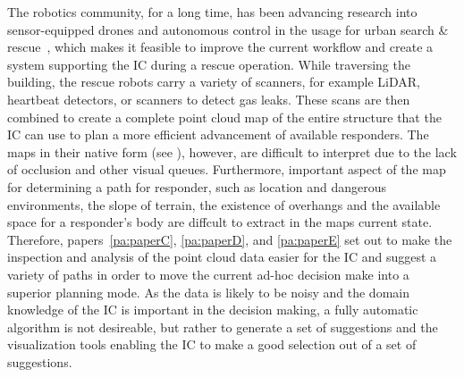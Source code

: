 The robotics community, for a long time, has been advancing research into sensor-equipped drones and autonomous control in the usage for urban search \& rescue~\cite{liu2013robotic}, which makes it feasible to improve the current workflow and create a system supporting the IC during a rescue operation.  While traversing the building, the rescue robots carry a variety of scanners, for example LiDAR, heartbeat detectors, or scanners to detect gas leaks.  These scans are then combined to create a complete  point cloud map of the entire structure that the IC can use to plan a more efficient  advancement of available responders.  The maps in their native form (see ), however, are difficult to interpret due to the lack of occlusion and other visual queues.  Furthermore, important aspect of the map for determining a path for responder, such as location and dangerous environments, the slope of terrain, the existence of overhangs and the available space for a responder's body are diffcult to extract in the maps current state.  Therefore, papers~\ref{pa:paperC}, \ref{pa:paperD}, and \ref{pa:paperE} set out to make the inspection and analysis of the  point cloud data easier for the IC and suggest a variety of paths in order to move the current ad-hoc decision make into a superior planning mode.  As the data is likely to be noisy and the domain knowledge of the IC is important in the decision making, a fully automatic algorithm is not desireable, but rather to generate a set of suggestions and the visualization tools enabling the IC to make a good selection out of a set of suggestions.


